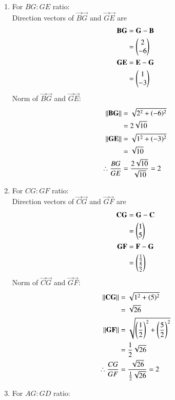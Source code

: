 \documentclass[journal,12pt,onecolumn]{IEEEtran}
\theoremstyle{remark}
\begin{document}
\begin{enumerate} 
\item For ${BG}:{GE}$ ratio:\\
Direction vectors of $\vec{B}\vec{G}$ and $\vec{G}\vec{E}$ are \\
\begin{align}
\mathbf{B}\mathbf{G}&=\mathbf{G}-\mathbf{B}\\
              &=\begin{pmatrix}2\\-6\end{pmatrix}\\
\mathbf{G}\mathbf{E}&=\mathbf{E}-\mathbf{G}\\
              &=\begin{pmatrix}1\\-3\end{pmatrix}
\end{align} 
Norm of $\vec{B}\vec{G}$ and $\vec{G}\vec{E}$:
\begin{align}
\left\lVert\mathbf{B}\mathbf{G}\right\rVert&=\sqrt{2^2+(-6)^2}\\
               &=2\sqrt{10}\\
\left\lVert\mathbf{G}\mathbf{E}\right\rVert&=\sqrt{1^2+(-3)^2}\\
               &=\sqrt{10}\\
\therefore \frac{BG}{GE}&=\frac{2\sqrt{10}}{\sqrt{10}}=2
\end{align}  
\item For ${CG}:{GF}$ ratio:\\
Direction vectors of $\vec{C}\vec{G}$ and $\vec{G}\vec{F}$ are \\    
\begin{align}
\mathbf{C}\mathbf{G}&=\mathbf{G}-\mathbf{C}\\
              &=\begin{pmatrix}1\\5\end{pmatrix}\\
\mathbf{G}\mathbf{F}&=\mathbf{F}-\mathbf{G}\\
              &=\begin{pmatrix}\frac{1}{2}\\\frac{5}{2}\end{pmatrix}
\end{align}
Norm of $\vec{C}\vec{G}$ and $\vec{G}\vec{F}$:\\
\begin{align}
\left\lVert\mathbf{C}\mathbf{G}\right\rVert&=\sqrt{1^2+(5)^2}\\
               &=\sqrt{26}\\
\left\lVert\mathbf{G}\mathbf{F}\right\rVert&=\sqrt{\left(\frac{1}{2}\right)^2+\left(\frac{5}{2}\right)^2}\\
               &=\frac{1}{2}\sqrt{26}\\
\therefore \frac{CG}{GF}&=\frac{\sqrt{26}}{\frac{1}{2}\sqrt{26}}=2
\end{align}
\item For ${AG}:{GD}$ ratio:\\

\end{enumerate}
\end{document}
